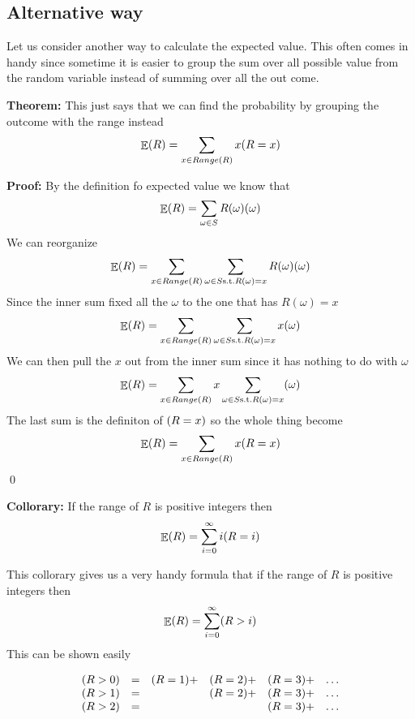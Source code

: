 \documentclass[a4paper, 12pt]{article}
\newcommand{\theorem}{\vspace{1em}\noindent\textbf{Theorem:} }
\newcommand{\collorary}{\vspace{1em}\noindent\textbf{Theorem:} }
\renewcommand{\proof}{\vspace{0.5em}\noindent\textbf{Proof:} }
\renewcommand{\collorary}{\vspace{1em}\noindent\textbf{Collorary:} }
\newcommand{\qedd}{\qed\newline}
\let\Pr\relax
\DeclareMathOperator{\Pr}{Pr}
\DeclareMathOperator{\E}{\mathbb{E}}
\begin{document}
\begin{multicols}{2}
	\section*{Alternative way}
	Let us consider another way to calculate the expected value. This often comes in handy since sometime it is easier to group the sum over all possible value from the random variable instead of summing over all the out come.
	
	\theorem This just says that we can find the probability by grouping the outcome with the range instead\[
		\E(R)  = \sum_{x \in Range(R)} x \Pr(R=x)
	\]
	
	\proof By the definition fo expected value we know that
	\[
		\E(R) = \sum_{\omega \in S} R(\omega) \Pr(\omega)
	\]
	We can reorganize
	\[
		\E(R) = \sum_{x\in Range(R)} \sum_{\omega \in S \text{s.t.} R(\omega)=x } R(\omega) \Pr(\omega)
	\]
	Since the inner sum fixed all the $\omega$ to the one that has $R(\omega) = x$
	\[
		\E(R) = \sum_{x\in Range(R)} \sum_{\omega \in S \text{s.t.} R(\omega)=x } x \Pr(\omega)
	\]
	We can then pull the $x$ out from the inner sum since it has nothing to do with $\omega$
	\[
		\E(R) = \sum_{x\in Range(R)} x \sum_{\omega \in S \text{s.t.} R(\omega)=x } \Pr(\omega)
	\]
	The last sum is the definiton of $\Pr(R=x)$ so the whole thing become
	\[
	\E(R) = \sum_{x\in Range(R)} x \Pr(R=x)
	\]	
	\qedd
	
	\collorary If the range of $R$ is positive integers then
	\[
		\E(R) = \sum_{i=0}^{\infty} i \Pr(R=i)
	\]
	
	This collorary gives us a very handy formula that if the range of $R$ is positive integers then
	\[
		\E (R) = \sum_{i=0}^{\infty} \Pr(R>i)
	\]
	This can be shown easily
\end{multicols}
	\[
	\begin{array}{rccccc}
		\Pr(R>0) & = & \Pr(R=1) +& \Pr(R=2) +& \Pr(R=3) +& \ldots \\
		\Pr(R>1) & = &  & \Pr(R=2) +& \Pr(R=3) +& \ldots \\
		\Pr(R>2) & = & & & \Pr(R=3) +& \ldots
	\end{array}
	\]
\end{document}
